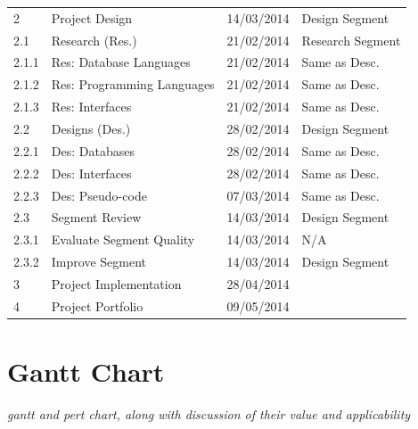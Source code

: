 \begin{tabular}{llrl}
    \midrule
    
    2        & Project Design               & 14/03/2014  & Design Segment    \\
    
    \cmidrule(r){2-3}
    2.1      & Research (Res.)              & 21/02/2014  & Research Segment  \\
    2.1.1    & Res: Database Languages      & 21/02/2014  & Same as Desc.     \\
    2.1.2    & Res: Programming Languages   & 21/02/2014  & Same as Desc.     \\
    2.1.3    & Res: Interfaces              & 21/02/2014  & Same as Desc.     \\
    \cmidrule(r){2-3}
    
    2.2      & Designs (Des.)               & 28/02/2014  & Design Segment    \\
    2.2.1    & Des: Databases               & 28/02/2014  & Same as Desc.     \\
    2.2.2    & Des: Interfaces              & 28/02/2014  & Same as Desc.     \\
    2.2.3    & Des: Pseudo-code             & 07/03/2014  & Same as Desc.     \\
    \cmidrule(r){2-3}
    
    2.3      & Segment Review               & 14/03/2014  & Design Segment    \\
    2.3.1    & Evaluate Segment Quality     & 14/03/2014  & N/A               \\
    2.3.2    & Improve Segment              & 14/03/2014  & Design Segment    \\
    
    \midrule
    
    3        & Project Implementation       & 28/04/2014  &  \\
    
    
    \midrule
    
    4        & Project Portfolio            & 09/05/2014  &  \\
    
    
    
    \bottomrule

\end{tabular}


\section{Gantt Chart}
\textit{gantt and pert chart, along with discussion of their value and
applicability}


